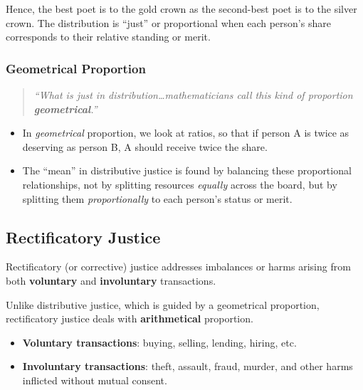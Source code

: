                Hence, the best poet is to the gold crown as the second-best poet is to the silver crown. The distribution is ``just'' or proportional when each person's share corresponds to their relative standing or merit.

                \subsubsection{Geometrical Proportion}

                    \begin{quote}
                    \textit{``What is just in distribution\ldots mathematicians call this kind of proportion \textbf{geometrical}.''}
                    \end{quote}

                    \begin{itemize}
                      \item In \textit{geometrical} proportion, we look at ratios, so that if person A is twice as deserving as person B, A should receive twice the share.
                      \item The ``mean'' in distributive justice is found by balancing these proportional relationships, not by splitting resources \textit{equally} across the board, but by splitting them \textit{proportionally} to each person's status or merit.
                    \end{itemize}

            \subsection{Rectificatory Justice}

                \begin{proposition}
                    Rectificatory (or corrective) justice addresses imbalances or harms arising from both \textbf{voluntary} and \textbf{involuntary} transactions.
                \end{proposition}
                
                Unlike distributive justice, which is guided by a geometrical proportion, rectificatory justice deals with \textbf{arithmetical} proportion.

                \begin{itemize}
                  \item \textbf{Voluntary transactions}: buying, selling, lending, hiring, etc.
                  \item \textbf{Involuntary transactions}: theft, assault, fraud, murder, and other harms inflicted without mutual consent.
                \end{itemize}

